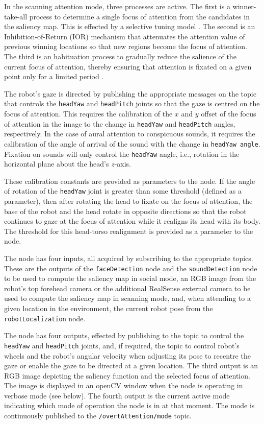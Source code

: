\documentclass{CSSRforAfrica}
\begin{document}
{{In the  scanning attention mode, three processes are active.
The first is a winner-take-all process to determine a single focus of attention from the candidates in the saliency map. This is effected by a selective tuning model \cite{Tsotsosetal95,Tsotsos06,Tsotsos11}.
The second is an Inhibition-of-Return (IOR) mechanism that attenuates the attention value of previous winning locations so that new regions become the focus of attention.
The third is an habituation process to gradually reduce the salience of the current focus of attention, thereby ensuring that attention is fixated on a given point only for a limited period \cite{ZaharescuRothensteinTsotsos05}. 

The robot's gaze is directed by publishing the appropriate  messages on the topic that controls the {\small \verb+headYaw+} and {\small \verb+headPitch+} joints so that the gaze is centred on the focus of attention.  This requires the calibration of the $x$ and $y$ offset of the focus of attention in the image to the change in {\small \verb+headYaw+} and {\small \verb+headPitch+} angles, respectively.  In the case of aural attention to conspicuous sounds, it requires the calibration of the angle of arrival  of the sound with the change in {\small \verb+headYaw angle+}.  Fixation on sounds will only control the {\small \verb+headYaw+} angle, i.e., rotation in the horizontal plane about the head's $z$-axis.  

These calibration constants are  provided as parameters to the node.  If the angle of rotation of the {\small \verb+headYaw+}  joint is greater than some threshold (defined as a parameter), then after rotating the head to fixate on the focus of attention, the base of the robot and the head  rotate in opposite directions so that the robot continues to gaze at the focus of attention while it realigns its head with its body.  The threshold for this head-torso realignment is provided as a parameter to the node.

The node has four inputs, all acquired by subscribing to the appropriate topics. These are the outputs of the  {\small \verb+faceDetection+} node and the {\small \verb+soundDetection+} node to be used to compute the saliency map in social mode, an RGB image from the robot's top forehead camera or the additional RealSense external camera to be used to compute the saliency map in scanning mode, and, when attending to a given location in the environment,  the current robot pose from the {\small \verb+robotLocalization+} node.
 
The node has four outputs, effected by publishing to the topic to control the {\small \verb+headYaw+} and {\small \verb+headPitch+} joints, and, if required, the topic to control robot's wheels and the robot's angular velocity when adjusting its pose to recentre the  gaze or enable the gaze to be directed at a given location. The third output is an RGB image depicting the saliency function and the selected focus of attention.  
The image is displayed in an openCV window when the node is operating in verbose mode (see below). The fourth output is the current active mode indicating which mode of operation the node is in at that moment. The mode is continuously published to the {\small \verb+/overtAttention/mode+} topic.

}}
\end{document}
